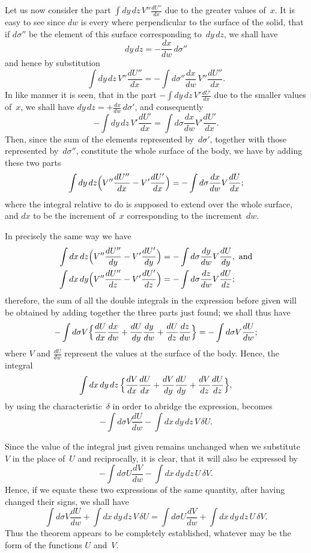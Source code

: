 \documentclass[11pt,notitlepage]{amsart}
\begin{document}
Let us now consider the part $\int dy\,dz\,V''\frac{dU''}{dx}$
due to the greater values
of~$x$. It is easy to see
since $dw$ is every where perpendicular to the surface
of the solid, that if $d\sigma''$ be the element
of this surface corresponding to~$dy\,dz$,
we shall have
\[
dy\,dz = -\frac{dx}{dw}\,d\sigma''
\]
and hence by substitution
\[
\int dy\,dz\,V''\frac{dU''}{dx}
=-\int d\sigma''\frac{dx}{dw}\,V''\frac{dU''}{dx}.
\]
In like manner it is seen, that in the part
$-\int dy\,dz\,V'\frac{dU'}{dx}$ due to the smaller
values of~$x$, we shall have $dy\,dz=+\frac{dx}{dw}\,d\sigma'$,
and consequently
\[
-\int dy\,dz\,V'\frac{dU'}{dx}=
\int d\sigma\frac{dx}{dw}V'\frac{dU'}{dx}.
\]
Then, since the sum of the elements represented by~$d\sigma'$,
together with those
represented by~$d\sigma''$,
constitute the whole surface of the body, we have by
adding these two parts
\[
\int dy\,dz\Bigl(V''\frac{dU''}{dx}-V'\frac{dU'}{dx}\Bigr)=
-\int d\sigma\frac{dx}{dw}V\frac{dU}{dx};
\]
where the integral relative to do is supposed to extend over the whole surface,
and $dx$ to be the increment of~$x$ corresponding to the increment~$dw$.

In precisely the same way we have
\[
\begin{aligned}
\int dx\,dz\Bigl(V''\frac{dU''}{dy}-V'\frac{dU'}{dy}\Bigr)&=
-\int d\sigma\frac{dy}{dw}V\frac{dU}{dy}, \text{~and}\\
\int dx\,dy\Bigl(V''\frac{dU''}{dz}-V'\frac{dU'}{dz}\Bigr)&=
-\int d\sigma\frac{dz}{dw}V\frac{dU}{dz};
\end{aligned}
\]
therefore, the sum of all the double integrals in the expression before given
will be obtained by adding together the three parts just found; we shall
thus have
\[
-\int d\sigma V\Bigl\{
  \frac{dU}{dx}\frac{dx}{dw}
  +\frac{dU}{dy}\frac{dy}{dw}
  +\frac{dU}{dz}\frac{dz}{dw}
\Bigr\}=-\int d\sigma V \frac{dU}{dw};
\]
where $V$ and $\frac{dU}{dw}$ represent the values
at the surface of the body. Hence, the integral
\[
\int dx\,dy\,dz\,
\Bigl\{
  \frac{dV}{dx}\frac{dU}{dx}
  +\frac{dV}{dy}\frac{dU}{dy}
  +\frac{dV}{dz}\frac{dU}{dz}
\Bigr\},
\]
by using the characteristic~$\delta$
in order to abridge the expression, becomes
\[
-\int d\sigma V \frac{dU}{dw}-\int dx\,dy\,dz\,V\,\delta U.
\]

Since the value of the integral just given remains unchanged when
we substitute $V$ in the place of~$U$ and reciprocally,
it is clear, that it will
also be expressed by
\[
-\int d\sigma U \frac{dV}{dw}-\int dx\,dy\,dz\,U\,\delta V.
\]
Hence, if we equate these two expressions of the same quantity, after having
changed their signs, we shall have
\[
\tag{2.}
\int d\sigma V \frac{dU}{dw}+\int dx\,dy\,dz\,V\,\delta U=
\int d\sigma U \frac{dV}{dw}+\int dx\,dy\,dz\,U\,\delta V.
\]
Thus the theorem appears to be completely established, whatever may be the
form of the functions $U$ and~$V$.
\end{document}
